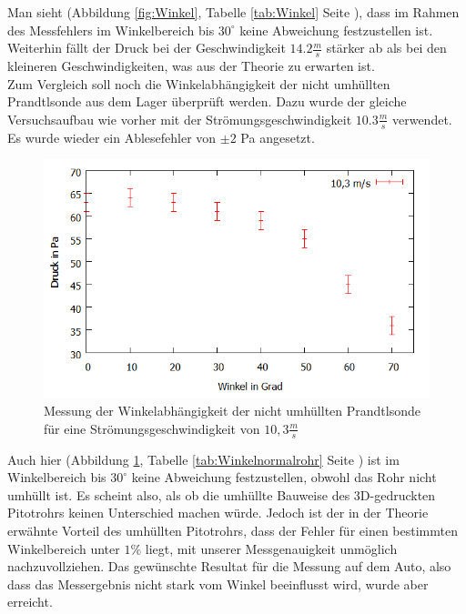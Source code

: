 Man sieht (Abbildung \ref{fig:Winkel}, Tabelle \ref{tab:Winkel} Seite \pageref{tab:Winkel}), dass im Rahmen des Messfehlers im Winkelbereich bis $30^\circ$ keine Abweichung festzustellen ist. Weiterhin fällt der Druck bei der Geschwindigkeit $14.2 \frac{m}{s}$ stärker ab als bei den kleineren Geschwindigkeiten, was aus der Theorie zu erwarten ist.
\\
Zum Vergleich soll noch die Winkelabhängigkeit der nicht umhüllten Prandtlsonde aus dem Lager überprüft werden. Dazu wurde der gleiche Versuchsaufbau wie vorher mit der Strömungsgeschwindigkeit $10.3 \frac{m}{s}$ verwendet. Es wurde wieder ein Ablesefehler von $\pm 2$ Pa angesetzt.
\begin{figure}
      \includegraphics[width=.9\textwidth]{images/Winkelnormalrohr}
\caption{Messung der Winkelabhängigkeit der nicht umhüllten Prandtlsonde für eine Strömungsgeschwindigkeit von $10,3 \frac{m}{s}$}
\label{fig:Winkelnormalrohr}
\end{figure}
Auch hier (Abbildung \ref{fig:Winkelnormalrohr}, Tabelle \ref{tab:Winkelnormalrohr} Seite \pageref{tab:Winkelnormalrohr}) ist im Winkelbereich bis $30^\circ$ keine Abweichung festzustellen, obwohl das Rohr nicht umhüllt ist.
Es scheint also, als ob die umhüllte Bauweise des 3D-gedruckten Pitotrohrs keinen Unterschied machen würde. Jedoch ist der in der Theorie erwähnte Vorteil des umhüllten Pitotrohrs, dass der Fehler für einen bestimmten Winkelbereich unter $1\%$ liegt, mit unserer Messgenauigkeit unmöglich nachzuvollziehen. Das gewünschte Resultat für die Messung auf dem Auto, also dass das Messergebnis nicht stark vom Winkel beeinflusst wird, wurde aber erreicht.
